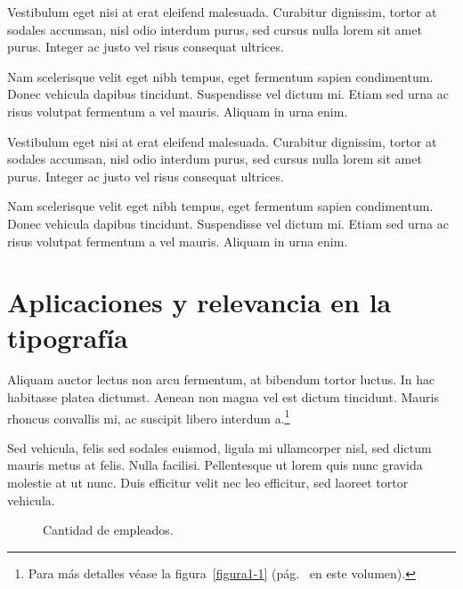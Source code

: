 Vestibulum eget nisi at erat eleifend malesuada. Curabitur dignissim, tortor at sodales accumsan, nisl odio interdum purus, sed cursus nulla lorem sit amet purus. Integer ac justo vel risus consequat ultrices.

Nam scelerisque velit eget nibh tempus, eget fermentum sapien condimentum. Donec vehicula dapibus tincidunt. Suspendisse vel dictum mi. Etiam sed urna ac risus volutpat fermentum a vel mauris. Aliquam in urna enim.

Vestibulum eget nisi at erat eleifend malesuada. Curabitur dignissim, tortor at sodales accumsan, nisl odio interdum purus, sed cursus nulla lorem sit amet purus. Integer ac justo vel risus consequat ultrices.

Nam scelerisque velit eget nibh tempus, eget fermentum sapien condimentum. Donec vehicula dapibus tincidunt. Suspendisse vel dictum mi. Etiam sed urna ac risus volutpat fermentum a vel mauris. Aliquam in urna enim.

\section{Aplicaciones y relevancia en la tipografía}

Aliquam auctor lectus non arcu fermentum, at bibendum tortor luctus. In hac habitasse platea dictumst. Aenean non magna vel est dictum tincidunt. Mauris rhoncus convallis mi, ac suscipit libero interdum a.\footnote{Para más detalles véase la figura~\ref{figura1-1} (pág.~\pageref{figura1-1} en este volumen).}

Sed vehicula, felis sed sodales euismod, ligula mi ullamcorper nisl, sed dictum mauris metus at felis. Nulla facilisi. Pellentesque ut lorem quis nunc gravida molestie at ut nunc. Duis efficitur velit nec leo efficitur, sed laoreet tortor vehicula.

\ifPDF
\begin{figure}[!ht]
\centering
\begin{bchart}[step=200,max=1000]
\end{bchart}
\caption{Cantidad de empleados.}
\end{figure}
\fi


